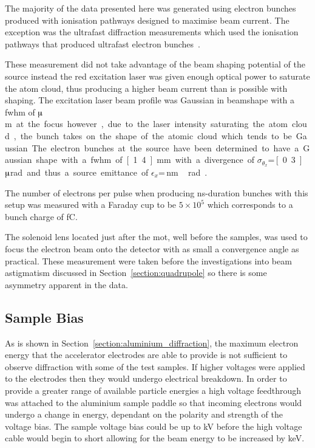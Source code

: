 The majority of the data presented here was generated using electron bunches produced with ionisation pathways designed to maximise beam current.
The exception was the ultrafast diffraction measurements which used the ionisation pathways that produced ultrafast electron bunches~\cite{speirs_single-shot_2015,speirs_identification_2017,speirs_electron_2017}.

These measurement did not take advantage of the beam shaping potential of the source instead the red excitation laser was given enough optical power to saturate the atom cloud, thus producing a higher beam current than is possible with shaping.
The excitation laser beam profile was Gaussian in beamshape with a \gls{fwhm} of \unit[80]{$\muup$m} at the focus however, due to the laser intensity saturating the atom cloud, the bunch takes on the shape of the atomic cloud which tends to be Gaussian.
The electron bunches at the source have been determined to have a Gaussian shape with a \gls{fwhm} of \unit[1.4]{mm} with a divergence of $\sigma_{\theta_x}$=\,\unit[0.3]{$\muup$rad} and thus a source emittance of $\epsilon_x$=\,\unit[50]{nm\,rad}~\cite{mcculloch_high-coherence_2013}.

The number of electrons per pulse when producing ns-duration bunches with this setup was measured with a Faraday cup to be $5\times10^5$ which corresponds to a bunch charge of \unit[80]{fC}.

The solenoid lens located just after the \gls{mot}, well before the samples, was used to focus the electron beam onto the detector with as small a convergence angle as practical.
These measurement were taken before the investigations into beam astigmatism discussed in Section~\ref{section:quadrupole} so there is some asymmetry apparent in the data.

\subsection{Sample Bias}\label{section:sample_bias}

As is shown in Section~\ref{section:aluminium_diffraction}, the maximum electron energy that the accelerator electrodes are able to provide is not sufficient to observe diffraction with some of the test samples.
If higher voltages were applied to the electrodes then they would undergo electrical breakdown.
In order to provide a greater range of available particle energies a high voltage feedthrough was attached to the aluminium sample paddle so that incoming electrons would undergo a change in energy, dependant on the polarity and strength of the voltage bias.
The sample voltage bias could be up to \unit[7]{kV} before the high voltage cable would begin to short allowing for the beam energy to be increased by \unit[7]{keV}.

